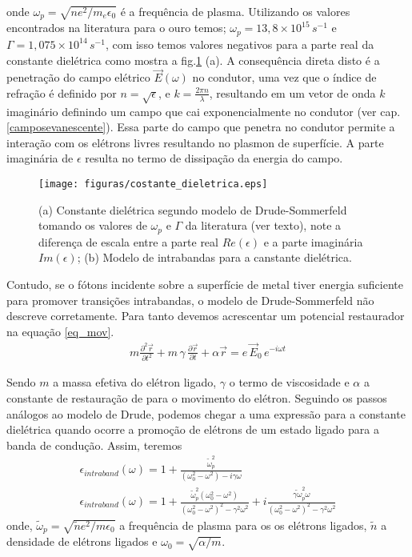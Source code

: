 onde $\omega_p = \sqrt{ne^2/m_e\epsilon_0}$ é a frequência de plasma. Utilizando os valores encontrados na literatura \cite{principle} para o ouro temos; $\omega_p=13,8 \times 10^{15}\,s^{-1}$ e $\Gamma = 1,075 \times 10^{14}\,s^{-1}$, com isso temos valores negativos para a parte real da constante dielétrica como mostra a fig.\ref{fig:cte_dieletrica} (a). A consequência direta disto é a penetração do campo elétrico $\vec{E}(\omega)$ no condutor, uma vez que o índice de refração é definido por $n=\sqrt{\epsilon}$, e $k=\frac{2\pi n}{\lambda}$, resultando em um vetor de onda $k$ imaginário definindo um campo que cai exponencialmente no condutor (ver cap. \ref{camposevanescente}). Essa parte do campo que penetra no condutor permite a interação com os elétrons livres resultando no plasmon de superfície. A parte imaginária de $\epsilon$ resulta no termo de dissipação da energia do campo.
\begin{figure}[h]

\centering
\texttt{[image: figuras/costante\_dieletrica.eps]}
\caption{(a) Constante dielétrica segundo modelo de Drude-Sommerfeld tomando os valores de $\omega_p$ e $\Gamma$ da literatura (ver texto), note a diferença de escala entre a parte real $Re(\epsilon)$ e a parte imaginária $Im(\epsilon)$; (b) Modelo de intrabandas para a canstante dielétrica.  \cite{principle}}
\label{fig:cte_dieletrica}
\end{figure}

Contudo, se o fótons incidente sobre a superfície de metal tiver energia suficiente para promover transições intrabandas, o modelo de Drude-Sommerfeld não descreve corretamente. Para tanto devemos acrescentar um potencial restaurador na equação \ref{eq_mov}.
\begin{eqnarray}
 m \frac{\partial^2\vec{r}}{\partial t^2} + m \, \gamma \, \frac{\partial\vec{r}}{\partial t} + \alpha \vec{r} = e \, \vec{E}_0 \, e^{-i \omega t}
\end{eqnarray}

Sendo $m$ a massa efetiva do elétron ligado, $\gamma$ o termo de viscosidade e $\alpha$ a constante de restauração de para o movimento do elétron. Seguindo os passos análogos ao modelo de Drude, podemos chegar a uma expressão para a constante dielétrica quando ocorre a promoção de elétrons de um estado ligado para a banda de condução. Assim, teremos 
\begin{eqnarray}
\epsilon_{intraband}(\omega) = 1+ \frac{\tilde{\omega}_p^2}{(\omega_0^2-\omega^2) - i\gamma \omega} \nonumber \\
\epsilon_{intraband}(\omega) = 1+ \frac{\tilde{\omega}_p^2 (\omega_0^2-\omega^2)}{(\omega_0^2-\omega^2)^2 - \gamma^2 \omega^2} + i\frac{\tilde{\gamma \omega}_p^2 \omega}{(\omega_0^2-\omega^2)^2 - \gamma^2 \omega^2}
\end{eqnarray}
onde, $\tilde{\omega}_p = \sqrt{\tilde{n}e^2/m\epsilon_0}$ a frequência de plasma para os os elétrons ligados, $\tilde{n}$ a densidade de elétrons ligados e $\omega_0 = \sqrt{\alpha/m}$. 
 
